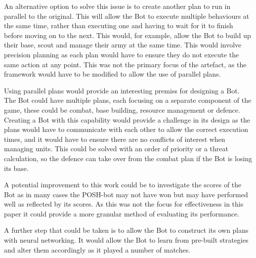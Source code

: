 \documentclass[journal]{IEEEtran}
\begin{document}
	An alternative option to solve this issue is to create another plan to run in parallel to the original. This will allow the Bot to execute multiple behaviours at the same time, rather than executing one and having to wait for it to finish before moving on to the next. This would, for example, allow the Bot to build up their base, scout and manage their army at the same time. This would involve precision planning as each plan would have to ensure they do not execute the same action at any point. This was not the primary focus of the artefact, as the framework would have to be modified to allow the use of parallel plans.
	
	Using parallel plans would provide an interesting premiss for designing a Bot. The Bot could have multiple plans, each focusing on a separate component of the game, these could be combat, base building, resource management or defence. Creating a Bot with this capability would provide a challenge in its design as the plans would have to communicate with each other to allow the correct execution times, and it would have to ensure there are no conflicts of interest when managing units. This could be solved with an order of priority or a threat calculation, so the defence can take over from the combat plan if the Bot is losing its base.
	
	A potential improvement to this work could be to investigate the scores of the Bot as in many cases the POSH-bot may not have won but may have performed well as reflected by its scores. As this was not the focus for effectiveness in this paper it could provide a more granular method of evaluating its performance. 
	
	A further step that could be taken is to allow the Bot to construct its own plans with neural networking. It would allow the Bot to learn from pre-built strategies and alter them accordingly as it played a number of matches.
	
\end{document}
